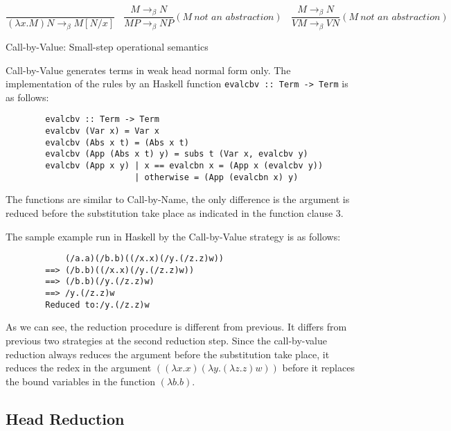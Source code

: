 \begin{equation*}
\frac{}{(\lambda x.M)N \rightarrow _\beta M[N/x]}\ \ \ \  
\frac{M \rightarrow _\beta N}{MP \rightarrow _\beta NP}(M\ \textit{not an abstraction})\ \ \ \
\frac{M \rightarrow _\beta N}{VM \rightarrow _\beta VN}(M\ \textit{not an abstraction})\ \ \ 
\end{equation*}
\begin{center}
Call-by-Value: Small-step operational semantics
\end{center}

Call-by-Value generates terms in weak head normal form only. The implementation of the rules by an Haskell function \verb|evalcbv :: Term -> Term| is as follows:

\begin{verbatim}
        evalcbv :: Term -> Term
        evalcbv (Var x) = Var x
        evalcbv (Abs x t) = (Abs x t)
        evalcbv (App (Abs x t) y) = subs t (Var x, evalcbv y)
        evalcbv (App x y) | x == evalcbn x = (App x (evalcbv y))
                          | otherwise = (App (evalcbn x) y)  
\end{verbatim}

The functions are similar to Call-by-Name, the only difference is the argument is reduced before the substitution take place as indicated in the function clause 3.

\begin{exmp}
\normalfont The sample example run in Haskell by the Call-by-Value strategy is as follows:
\end{exmp}

\begin{verbatim}
            (/a.a)(/b.b)((/x.x)(/y.(/z.z)w))
        ==> (/b.b)((/x.x)(/y.(/z.z)w))
        ==> (/b.b)(/y.(/z.z)w)
        ==> /y.(/z.z)w
        Reduced to:/y.(/z.z)w
\end{verbatim}

As we can see, the reduction procedure is different from previous. It differs from previous two strategies at the second reduction step. Since the call-by-value reduction always reduces the argument before the substitution take place, it reduces the redex in the argument $((\lambda x.x)(\lambda y.(\lambda z.z)w))$ before it replaces the bound variables in the function $(\lambda b.b)$.    


\subsection{Head Reduction}

